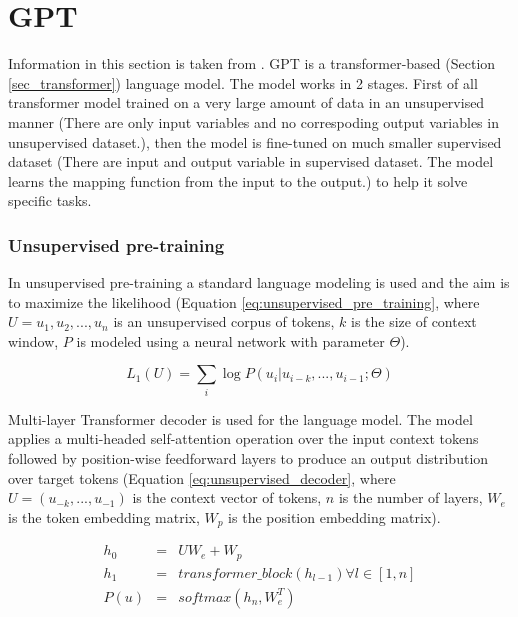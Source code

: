 \section{GPT}
Information in this section is taken from \cite{radford2018improving}.
GPT is a transformer-based (Section \ref{sec_transformer}) language model. The model works in 2 stages. First of all transformer model trained on a very large amount of data in an unsupervised manner (There are only input variables and no correspoding output variables in unsupervised dataset.), then the model is fine-tuned on much smaller supervised dataset (There are input and output variable in supervised dataset. The model learns the mapping function from the input to the output.) to help it solve specific tasks.

\subsubsection{Unsupervised pre-training}
In unsupervised pre-training a standard language modeling is used and the aim is to maximize the likelihood (Equation \ref{eq:unsupervised_pre_training}, where $U = {u_1, u_2, ... , u_n}$ is an unsupervised corpus of tokens, $k$ is the size of context window, $P$ is modeled using a neural network with parameter $\Theta$).

\begin{equation} \label{eq:unsupervised_pre_training}
L_1(U) = \sum_i \log P(u_i|u_{i-k}, ... , u_{i-1}; \Theta)
\end{equation}

Multi-layer Transformer decoder is used for the language model. The model applies a multi-headed self-attention operation over the input context tokens followed by position-wise feedforward layers to produce an output distribution
over target tokens (Equation \ref{eq:unsupervised_decoder}, where $U = (u_{-k}, ... , u_{-1})$ is the context vector of tokens, $n$ is the number of layers, $W_e$ is the token embedding matrix, $W_p$ is the position embedding matrix).

\begin{equation}  \label{eq:unsupervised_decoder}
\begin{array}{lcl} 
h_0 & = &UW_e + W_p \\

h_1 & = & transformer\_block(h_{l-1}) \forall l \in [1,n] \\

P(u) & = & softmax(h_n, W_e^T) \\
\end{array}
\end{equation}


